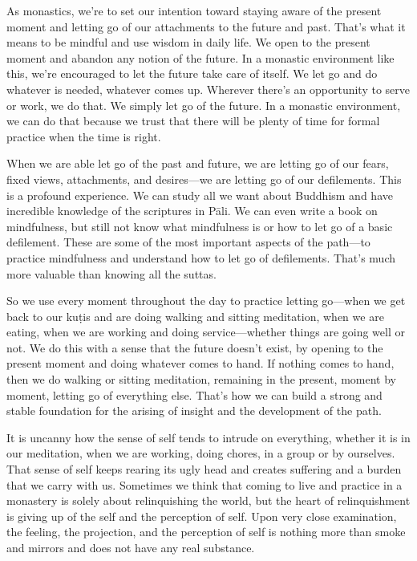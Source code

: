 As monastics, we're to set our intention toward staying aware of the 
present moment and letting go of our attachments to the future and 
past. That's what it means to be mindful and use wisdom in daily life. 
We open to the present moment and abandon any notion of the future. In 
a monastic environment like this, we're encouraged to let the future 
take care of itself. We let go and do whatever is needed, whatever 
comes up. Wherever there's an opportunity to serve or work, we do that. 
We simply let go of the future. In a monastic environment, we can do 
that because we trust that there will be plenty of time for formal 
practice when the time is right.

When we are able let go of the past and future, we are letting go of 
our fears, fixed views, attachments, and desires---we are letting go of 
our defilements. This is a profound experience. We can study all we 
want about Buddhism and have incredible knowledge of the scriptures in 
Pāli. We can even write a book on mindfulness, but still not know what 
mindfulness is or how to let go of a basic defilement. These are some 
of the most important aspects of the path---to practice mindfulness and 
understand how to let go of defilements. That's much more valuable than 
knowing all the suttas.

So we use every moment throughout the day to practice letting go---when 
we get back to our kuṭis and are doing walking and sitting 
meditation, when we are eating, when we are working and doing 
service---whether things are going well or not. We do this with a sense 
that the future doesn't exist, by opening to the present moment and 
doing whatever comes to hand. If nothing comes to hand, then we do 
walking or sitting meditation, remaining in the present, moment by 
moment, letting go of everything else. That's how we can build a strong 
and stable foundation for the arising of insight and the development of 
the path.


It is uncanny how the sense of self tends to intrude on everything, 
whether it is in our meditation, when we are working, doing chores, in 
a group or by ourselves. That sense of self keeps rearing its ugly head 
and creates suffering and a burden that we carry with us. Sometimes we 
think that coming to live and practice in a monastery is solely about 
relinquishing the world, but the heart of relinquishment is giving up 
of the self and the perception of self. Upon very close examination, 
the feeling, the projection, and the perception of self is nothing more 
than smoke and mirrors and does not have any real substance.

